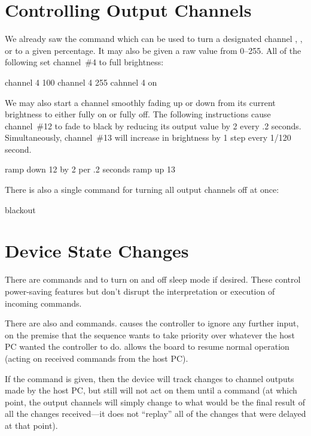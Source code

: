\documentclass[letterpaper,twoside,onecolumn,openright,final]{memoir}
\begin{document}
{\section{Controlling Output Channels}
We already saw the  command which can be used to turn a designated channel , 
, or to a given percentage.  It may also be given a raw value from 0--255.  All of the following
set channel~\#4 to full brightness:
\begin{SourceCode}
channel 4 100%
channel 4 255
cahnnel 4 on
\end{SourceCode}

We may also start a channel smoothly fading up or down from its current brightness to either fully
on or fully off.  The following instructions cause channel~\#12 to fade to black by reducing its 
output value by 2 every .2 seconds.  Simultaneously, channel~\#13 will increase in brightness by 1 step
every 1/120\,second.
\begin{SourceCode}
ramp down 12 by 2 per .2 seconds
ramp up 13
\end{SourceCode}

There is also a single command for turning all output channels off at once:
\begin{SourceCode}
blackout
\end{SourceCode}

\section{Device State Changes}
There are commands  and  to turn on and off sleep mode if desired.
These control power-saving features but don't disrupt the interpretation or execution of
incoming commands.

There are also  and  commands.   causes the controller
to ignore any further input, on the premise that the sequence wants to take priority over
whatever the host PC wanted the controller to do.   allows the board to resume
normal operation (acting on received commands from the host PC).

If the command  is given, then the device will track changes to
channel outputs made by the host PC, but still will not act on them until a 
command (at which point, the output channels will simply change to what would be the
final result of all the changes received---it does not ``replay'' all of the changes
that were delayed at that point).  

}
\end{document}

